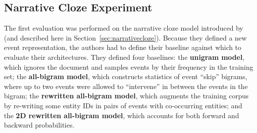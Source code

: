 \subsection{Narrative Cloze Experiment}
The first evaluation was performed on the narrative cloze model introduced by \citep{chambers2008unsupervised} (and described here in Section~\ref{sec:narrativecloze}). Because they defined a new event representation, the authors had to define their baseline against which to evaluate their architectures. They defined four baselines: the \textbf{unigram model}, which ignores the document and samples events by their frequency in the training set; the \textbf{all-bigram model}, which constructs statistics of event ``skip'' bigrams, where up to two events were allowed to ``intervene'' in between the events in the bigram; the \textbf{rewritten all-bigram model}, which augments the training corpus by re-writing some entity IDs in pairs of events with co-occurring entities; and the \textbf{2D rewritten all-bigram model}, which accounts for both forward and backward probabilities.

